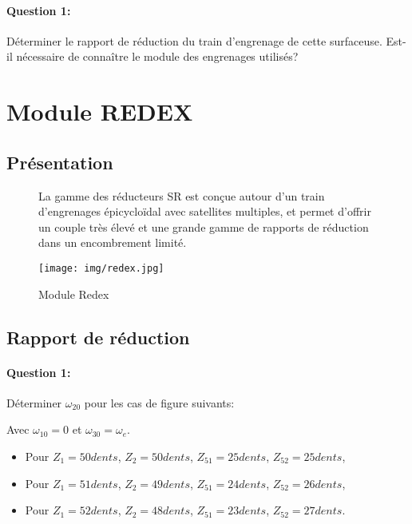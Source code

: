 \paragraph{Question 1:} Déterminer le rapport de réduction du train d'engrenage de cette surfaceuse. Est-il nécessaire de connaître le module des engrenages utilisés?



\newpage

\section{Module REDEX}

\subsection{Présentation}
\begin{figure}[!h]
\begin{minipage}{0.6\linewidth}
La gamme des réducteurs SR est conçue autour d'un train d'engrenages épicycloïdal avec satellites multiples, et permet d'offrir un couple très élevé et une grande gamme de rapports de réduction dans un encombrement limité.
\end{minipage}
 \hfill
\begin{minipage}{0.35\linewidth}
 \centering\texttt{[image: img/redex.jpg]}
 \caption{Module Redex}
 \label{fig9}
\end{minipage}
\end{figure}

\subsection{Rapport de réduction}

\paragraph{Question 1:} Déterminer $\omega_{20}$ pour les cas de figure suivants:

Avec $\omega_{10}=0$ et $\omega_{30}=\omega_e$.

\begin{itemize}
 \item Pour $Z_1=50dents$, $Z_2=50dents$, $Z_{51}=25dents$, $Z_{52}=25dents$,
 \item Pour $Z_1=51dents$, $Z_2=49dents$, $Z_{51}=24dents$, $Z_{52}=26dents$,
 \item Pour $Z_1=52dents$, $Z_2=48dents$, $Z_{51}=23dents$, $Z_{52}=27dents$.
\end{itemize}


